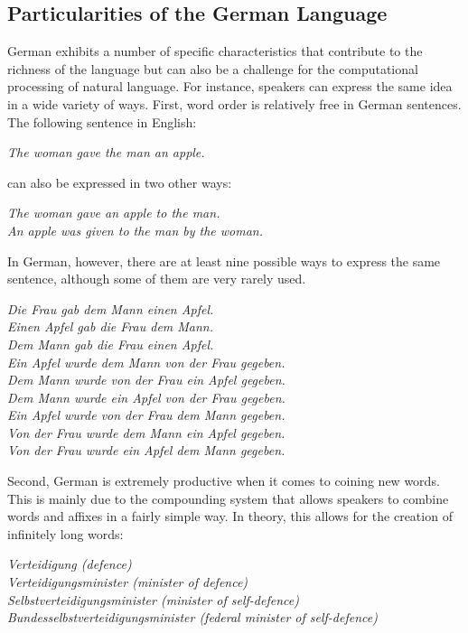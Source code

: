 \documentclass[]{../metanetpaper}
\begin{document}
	\subsection{Particularities of the German Language}
German exhibits a number of specific characteristics that contribute to the richness of the language but can also be a challenge for the computational processing of natural language. For instance, speakers can express the same idea in a wide variety of ways.
First, word order is relatively free in German sentences. The following sentence in English:
\begin{center}
\textit{The woman gave the man an apple.}
\end{center}
can also be expressed in two other ways:
\begin{center}
\textit{The woman gave an apple to the man.}\\
\textit{An apple was given to the man by the woman.}
\end{center}
In German, however, there are at least nine possible ways to express the same sentence, although some of them are very rarely used.
\begin{center}
\textit{Die Frau gab dem Mann einen Apfel.\\
Einen Apfel gab die Frau dem Mann.\\
Dem Mann gab die Frau einen Apfel.\\
Ein Apfel wurde dem Mann von der Frau gegeben.\\
Dem Mann wurde von der Frau ein Apfel gegeben.\\
Dem Mann wurde ein Apfel von der Frau gegeben.\\
Ein Apfel wurde von der Frau dem Mann gegeben.\\
Von der Frau wurde dem Mann ein Apfel gegeben.\\
Von der Frau wurde ein Apfel dem Mann gegeben.}
\end{center}
Second, German is extremely productive when it comes to coining new words. This is mainly due to the compounding system that allows speakers to combine words and affixes in a fairly simple way. In theory, this allows for the creation of infinitely long words:
\begin{center}
\textit{Verteidigung (defence)\\
Verteidigungsminister (minister of defence)\\
Selbstverteidigungsminister (minister of self-defence)\\
Bundesselbstverteidigungsminister (federal minister of self-defence)}
\end{center}
\end{document}
